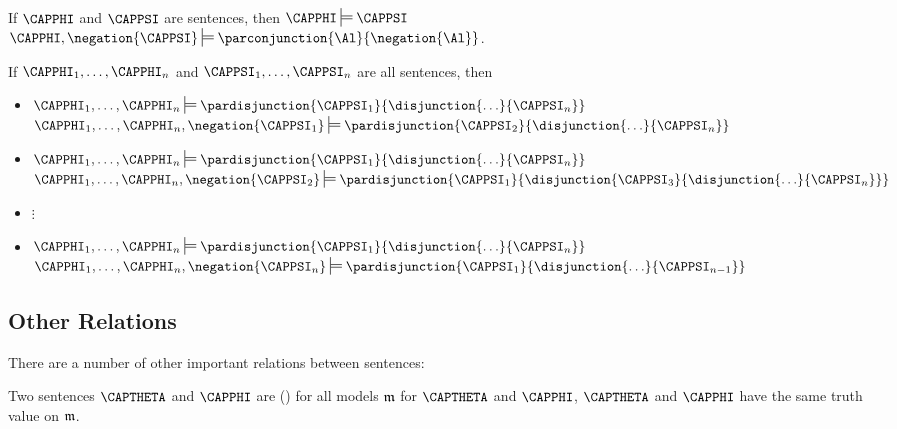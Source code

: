 \begin{THEOREM}
\begin{cenumerate}
\item If $\CAPPHI$ and $\CAPPSI$ are \GSL{} sentences, then $\CAPPHI\sdtstile{}{}\CAPPSI$ \Iff $\CAPPHI,\negation{\CAPPSI}\sdtstile{}{}\parconjunction{\Al}{\negation{\Al}}$.
\item If $\CAPPHI_1,\ldots,\CAPPHI_{\integer{n}}$ and $\CAPPSI_1,\ldots,\CAPPSI_{\integer{n}}$ are all \GSL{} sentences, then
\begin{itemize}
\item[] $\CAPPHI_1,\ldots,\CAPPHI_{\integer{n}}\sdtstile{}{}\pardisjunction{\CAPPSI_1}{\disjunction{\ldots}{\CAPPSI_{\integer{n}}}}$ \Iff $\CAPPHI_1,\ldots,\CAPPHI_{\integer{n}},\negation{\CAPPSI_1}\sdtstile{}{}\pardisjunction{\CAPPSI_2}{\disjunction{\ldots}{\CAPPSI_{\integer{n}}}}$
\item[] $\CAPPHI_1,\ldots,\CAPPHI_{\integer{n}}\sdtstile{}{}\pardisjunction{\CAPPSI_1}{\disjunction{\ldots}{\CAPPSI_{\integer{n}}}}$ \Iff $\CAPPHI_1,\ldots,\CAPPHI_{\integer{n}},\negation{\CAPPSI_2}\sdtstile{}{}\pardisjunction{\CAPPSI_1}{\disjunction{\CAPPSI_3}{\disjunction{\ldots}{\CAPPSI_{\integer{n}}}}}$
\item[] \hspace{1in} $\vdots$
\item[] $\CAPPHI_1,\ldots,\CAPPHI_{\integer{n}}\sdtstile{}{}\pardisjunction{\CAPPSI_1}{\disjunction{\ldots}{\CAPPSI_{\integer{n}}}}$ \Iff $\CAPPHI_1,\ldots,\CAPPHI_{\integer{n}},\negation{\CAPPSI_{\integer{n}}}\sdtstile{}{}\pardisjunction{\CAPPSI_1}{\disjunction{\ldots}{\CAPPSI_{n-1}}}$
\end{itemize} 
\end{cenumerate}
\end{THEOREM}

\subsection{Other Relations}\label{Other Relations}

There are a number of other important relations between \GSL{} sentences:

\begin{majorILnc}{}
Two sentences $\CAPTHETA$ and $\CAPPHI$ are   () \Iff for all models $\mathfrak{m}$ for $\CAPTHETA$ and $\CAPPHI$, $\CAPTHETA$ and $\CAPPHI$ have the same truth value on $\mathfrak{m}$.
\end{majorILnc}

